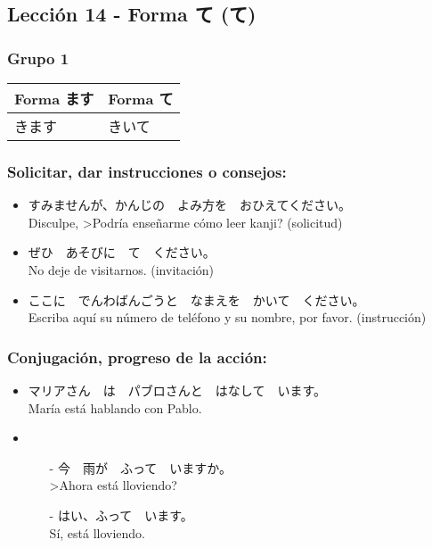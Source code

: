 \documentclass[a4paper,12pt,oneside]{report}
\def\bv{\textbf{V}} %
\def\vi{$\mathrm{\bv}_1$} %
\begin{document}
\begin{CJK*}{UTF8}{min}
    \section{Lección 14 - Forma て (て)}

        \subsubsection{Grupo 1}
        \begin{tabular}{ | l | l | }
          \hline
          \cellcolor[gray]{0.9} Forma ます & \cellcolor[gray]{0.9} Forma て\\
          \hline
          きます　& きいて\\
          \hline
        \end{tabular}

      \subsubsection{Solicitar, dar instrucciones o consejos:}
        \fbox{\bv(て) + ください}

        \begin{itemize}
          \item すみませんが、かんじの　よみ方を　おひえてください。\\
                Disculpe, >Podr\'ia enseñarme c\'omo leer kanji? (solicitud)
          \item ぜひ　あそびに　て　ください。\\
                No deje de visitarnos. (invitaci\'on)
          \item ここに　でんわばんごうと　なまえを　かいて　ください。\\
                Escriba aqu\'i su n\'umero de tel\'efono y su nombre, por favor. (instrucci\'on)
        \end{itemize}

      \subsubsection{Conjugaci\'on, progreso de la acci\'on:}
        \fbox{\vi(て) + います}

        \begin{itemize}
          \item マリアさん　は　パブロさんと　はなして　います。\\
                Mar\'ia est\'a hablando con Pablo.
          \item
            \begin{itemize}
              \item[-] 今　雨が　ふって　いますか。\\
                       >Ahora est\'a lloviendo?
              \item[-] はい、ふって　います。\\
                       S\'i, est\'a lloviendo.
            \end{itemize}
        \end{itemize}


\end{CJK*}
\end{document}
